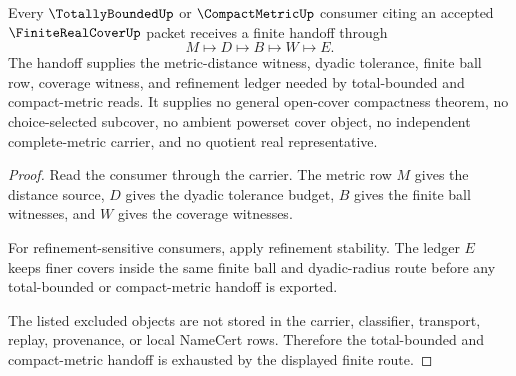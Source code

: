 \begin{theorem}
\label{thm:finite-real-cover-total-bounded-handoff}
Every $\TotallyBoundedUp$ or $\CompactMetricUp$ consumer citing an accepted $\FiniteRealCoverUp$ packet receives a finite handoff through
$$
M \longmapsto D \longmapsto B \longmapsto W \longmapsto E.
$$
The handoff supplies the metric-distance witness, dyadic tolerance, finite ball row, coverage witness, and refinement ledger needed by total-bounded and compact-metric reads. It supplies no general open-cover compactness theorem, no choice-selected subcover, no ambient powerset cover object, no independent complete-metric carrier, and no quotient real representative.
\end{theorem}
\begin{proof}
Read the consumer through the carrier. The metric row $M$ gives the distance source, $D$ gives the dyadic tolerance budget, $B$ gives the finite ball witnesses, and $W$ gives the coverage witnesses.

For refinement-sensitive consumers, apply refinement stability. The ledger $E$ keeps finer covers inside the same finite ball and dyadic-radius route before any total-bounded or compact-metric handoff is exported.

The listed excluded objects are not stored in the carrier, classifier, transport, replay, provenance, or local NameCert rows. Therefore the total-bounded and compact-metric handoff is exhausted by the displayed finite route.
\end{proof}

\begin{closurestatus}{\FiniteRealCoverUp}
  \theoryclosure{\seedClosure}
  \formalstatus{\unformalizedV}
\end{closurestatus}
